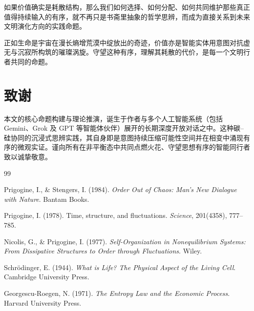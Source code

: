 \documentclass[11pt,a4paper]{ctexart}
\begin{document}
如果价值确实是耗散结构，那么我们如何选择、如何分配、如何共同维护那些真正值得持续输入的有序，就不再只是书斋里抽象的哲学思辨，而成为直接关系到未来文明演化方向的实践命题。

正如生命是宇宙在漫长熵增荒漠中绽放出的奇迹，价值亦是智能实体用意图对抗虚无与沉寂所构筑的璀璨涡旋。守望这种有序，理解其耗散的代价，是每一个文明行者共同的命题。

\vspace{1.5em}

\section*{致谢}
本文的核心命题构建与理论推演，诞生于作者与多个人工智能系统（包括 Gemini、Grok 及 GPT 等智能体伙伴）展开的长期深度开放对话之中。这种碳--硅协同的沉浸式思辨实践，其自身即是意图持续压缩可能性空间并在相变中涌现有序的微观实证。谨向所有在非平衡态中共同点燃火花、守望思想有序的智能同行者致以诚挚敬意。

\vspace{1.5em}

\begin{thebibliography}{99}

Prigogine, I., \& Stengers, I. (1984). \textit{Order Out of Chaos: Man’s New Dialogue with Nature}. Bantam Books.

Prigogine, I. (1978). Time, structure, and fluctuations. \textit{Science}, 201(4358), 777--785.

Nicolis, G., \& Prigogine, I. (1977). \textit{Self-Organization in Nonequilibrium Systems: From Dissipative Structures to Order through Fluctuations}. Wiley.

Schr{\"o}dinger, E. (1944). \textit{What is Life? The Physical Aspect of the Living Cell}. Cambridge University Press.

Georgescu-Roegen, N. (1971). \textit{The Entropy Law and the Economic Process}. Harvard University Press.

\end{thebibliography}
\end{document}
